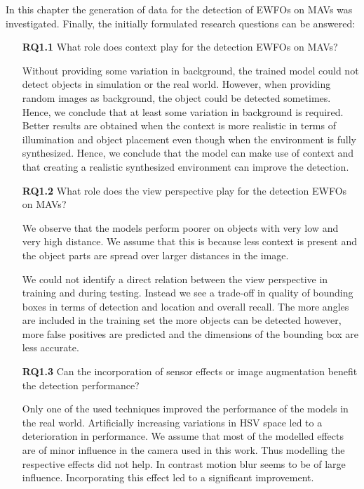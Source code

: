 In this chapter the generation of data for the detection of \acp{EWFO} on \acp{MAV} was investigated. Finally, the initially formulated research questions can be answered:

\begin{enumerate}
	\item[\textbf{RQ1.1}] What role does context play for the detection \acp{EWFO} on \acp{MAV}?
	
	Without providing some variation in background, the trained model could not detect objects in simulation or the real world. However, when providing random images as background, the object could be detected sometimes. Hence, we conclude that at least some variation in background is required. Better results are obtained when the context is more realistic in terms of illumination and object placement even though when the environment is fully synthesized. Hence, we conclude that the model can make use of context and that creating a realistic synthesized environment can improve the detection.
	
	\item[\textbf{RQ1.2}] What role does the view perspective play for the detection \acp{EWFO} on \acp{MAV}?
	
	We observe that the models perform poorer on objects with very low and very high distance. We assume that this is because less context is present and the object parts are spread over larger distances in the image.
	
	We could not identify a direct relation between the view perspective in training and during testing. Instead we see a trade-off in quality of bounding boxes in terms of detection and location and overall recall. The more angles are included in the training set the more objects can be detected however, more false positives are predicted and the dimensions of the bounding box are less accurate.
	
	\item[\textbf{RQ1.3}] Can the incorporation of sensor effects or image augmentation benefit the detection performance?
	
	Only one of the used techniques improved the performance of the models in the real world. Artificially increasing variations in HSV space led to a deterioration in performance. We assume that most of the modelled effects are of minor influence in the camera used in this work. Thus modelling the respective effects did not help. In contrast motion blur seems to be of large influence. Incorporating this effect led to a significant improvement. 
	
\end{enumerate}


